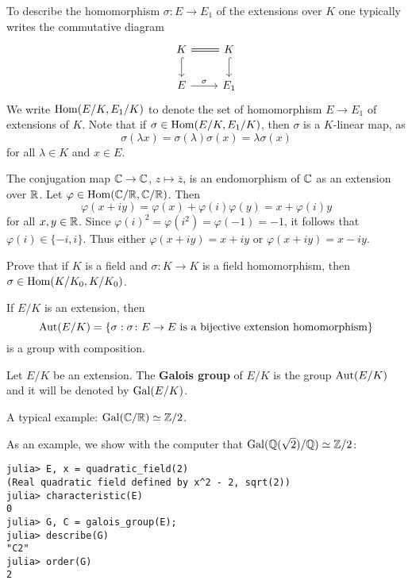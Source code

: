 To describe the homomorphism $\sigma\colon E\to E_1$ of the extensions over $K$
one typically writes the commutative diagram 
\[
	\begin{tikzcd}
	K & K \\
	E & {E_1} 
	\arrow["\sigma", from=2-1, to=2-2]
	\arrow[equal, no head, from=1-1, to=1-2]
	\arrow[hook, from=1-1, to=2-1]
	\arrow[hook, from=1-2, to=2-2]
\end{tikzcd}
\]
We write $\operatorname{Hom}(E/K,E_1/K)$ to denote
the set of homomorphism $E\to E_1$ of extensions of $K$. Note
that if $\sigma\in\operatorname{Hom}(E/K,E_1/K)$, then
$\sigma$ is a $K$-linear map, as
\[
	\sigma(\lambda x)=\sigma(\lambda)\sigma(x)=\lambda\sigma(x)
\]
for all $\lambda\in K$ and $x\in E$. 

\begin{example}
	The conjugation map $\mathbb{C}\to\mathbb{C}$, $z\mapsto\overline{z}$, 
	is an endomorphism of $\mathbb{C}$ as an extension over $\mathbb{R}$. Let 
	$\varphi\in\operatorname{Hom}(\mathbb{C}/\mathbb{R},\mathbb{C}/\mathbb{R})$. Then 
	\[
	\varphi(x+iy)=\varphi(x)+\varphi(i)\varphi(y)=x+\varphi(i)y
	\]
	for all $x,y\in\mathbb{R}$. Since $\varphi(i)^2=\varphi(i^2)=\varphi(-1)=-1$, 
	it follows that $\varphi(i)\in\{-i,i\}$. Thus either 
	$\varphi(x+iy)=x+iy$ or $\varphi(x+iy)=x-iy$. 
\end{example}

\begin{exercise}
	Prove that if $K$ is a field and $\sigma\colon K\to K$ is a field homomorphism, 
then $\sigma\in\operatorname{Hom}(K/K_0,K/K_0)$. 
\end{exercise}

If $E/K$ is an extension, then
\[
	\operatorname{Aut}(E/K)=\{\sigma:\sigma\colon E\to E\text{ is a bijective extension homomorphism}\}
\]
is a group with composition.

\begin{definition}
	Let $E/K$ be an extension. The \textbf{Galois group}
	of $E/K$ is the group
	$\operatorname{Aut}(E/K)$ and it will be denoted by $\operatorname{Gal}(E/K)$. 
\end{definition}

A typical example: $\operatorname{Gal}(\mathbb{C}/\mathbb{R})\simeq\mathbb{Z}/2$. 

As an example, we show with the computer that $\operatorname{Gal}(\mathbb{Q}(\sqrt{2})/\mathbb{Q})\simeq\mathbb{Z}/2$:
\begin{lstlisting}
julia> E, x = quadratic_field(2)
(Real quadratic field defined by x^2 - 2, sqrt(2))
julia> characteristic(E)
0
julia> G, C = galois_group(E);
julia> describe(G)
"C2"
julia> order(G)
2
\end{lstlisting}

